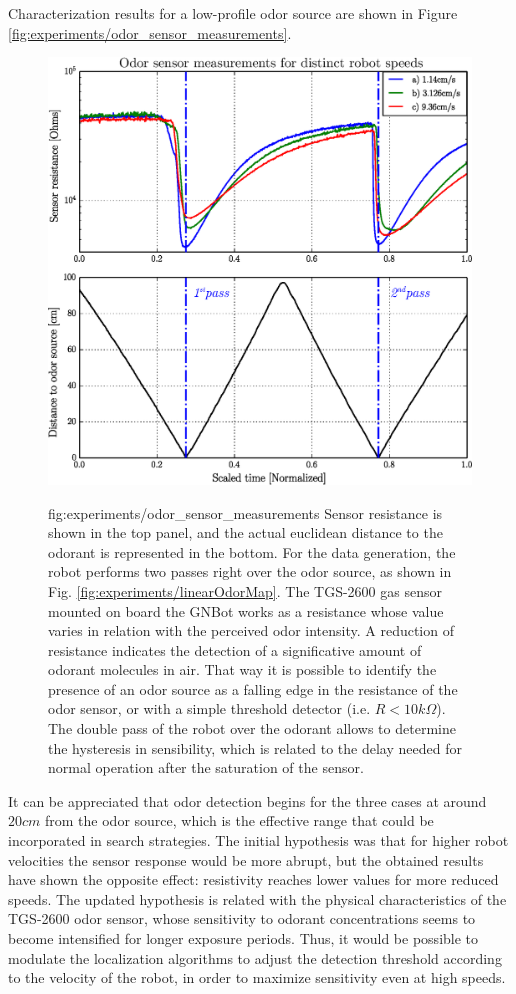 Characterization results for a low-profile odor source are shown in Figure \ref{fig:experiments/odor_sensor_measurements}.
\begin{figure}[h!]
\centerline{\mbox{\includegraphics[width=12.5cm]{images/experiments/odor_sensor_measurements.eps}}}
{fig:experiments/odor_sensor_measurements}{
Sensor resistance is shown in the top panel, and the actual euclidean distance to the odorant is represented in the bottom.
For the data generation, the robot performs two passes right over the odor source, as shown in Fig. \ref{fig:experiments/linearOdorMap}.
The TGS-2600 gas sensor mounted on board the GNBot works as a resistance whose value varies in relation with the perceived odor intensity.
A reduction of resistance indicates the detection of a significative amount of odorant molecules in air. That way it is possible to identify the presence of an odor source as a falling edge in the resistance of the odor sensor, or with a simple threshold detector (i.e. $R<10k\Omega$).
The double pass of the robot over the odorant allows to determine the hysteresis in sensibility, which is related to the delay needed for normal operation after the saturation of the sensor.
}
\end{figure}
It can be appreciated that odor detection begins for the three cases at around $20cm$ from the odor source, which is the effective range that could be incorporated in search strategies.
The initial hypothesis was that for higher robot velocities the sensor response would be more abrupt, but the obtained results have shown the opposite effect: resistivity reaches lower values for more reduced speeds.
The updated hypothesis is related with the physical characteristics of the TGS-2600 odor sensor, whose sensitivity to odorant concentrations seems to become intensified for longer exposure periods.
Thus, it would be possible to modulate the localization algorithms to adjust the detection threshold according to the velocity of the robot, in order to maximize sensitivity even at high speeds.




